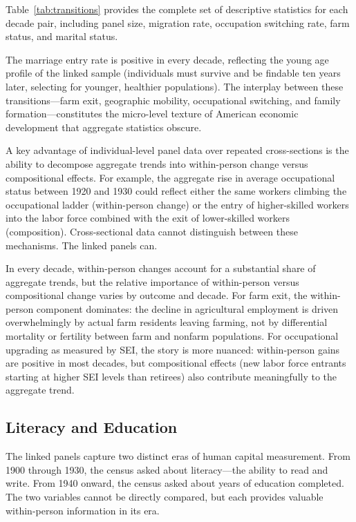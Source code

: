 \documentclass[12pt]{article}
\begin{document}
Table~\ref{tab:transitions} provides the complete set of descriptive statistics for each decade pair, including panel size, migration rate, occupation switching rate, farm status, and marital status.



The marriage entry rate is positive in every decade, reflecting the young age profile of the linked sample (individuals must survive and be findable ten years later, selecting for younger, healthier populations). The interplay between these transitions---farm exit, geographic mobility, occupational switching, and family formation---constitutes the micro-level texture of American economic development that aggregate statistics obscure.

A key advantage of individual-level panel data over repeated cross-sections is the ability to decompose aggregate trends into within-person change versus compositional effects. For example, the aggregate rise in average occupational status between 1920 and 1930 could reflect either the same workers climbing the occupational ladder (within-person change) or the entry of higher-skilled workers into the labor force combined with the exit of lower-skilled workers (composition). Cross-sectional data cannot distinguish between these mechanisms. The linked panels can.

In every decade, within-person changes account for a substantial share of aggregate trends, but the relative importance of within-person versus compositional change varies by outcome and decade. For farm exit, the within-person component dominates: the decline in agricultural employment is driven overwhelmingly by actual farm residents leaving farming, not by differential mortality or fertility between farm and nonfarm populations. For occupational upgrading as measured by SEI, the story is more nuanced: within-person gains are positive in most decades, but compositional effects (new labor force entrants starting at higher SEI levels than retirees) also contribute meaningfully to the aggregate trend.

\subsection{Literacy and Education}

The linked panels capture two distinct eras of human capital measurement. From 1900 through 1930, the census asked about literacy---the ability to read and write. From 1940 onward, the census asked about years of education completed. The two variables cannot be directly compared, but each provides valuable within-person information in its era.
\end{document}
